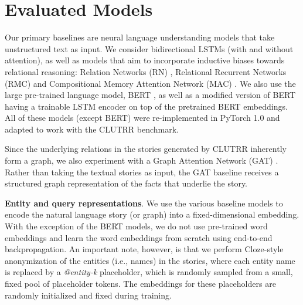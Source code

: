 \documentclass[letterpaper, 12pt]{report}
\newcommand{\xhdr}[1]{{\noindent\bfseries #1}.}
\begin{document}







\section{Evaluated Models}
\label{sec:clutrr_models}

Our primary baselines are neural language understanding models that take unstructured text as input.
We consider bidirectional LSTMs \citep{hochreiter1997long, cho2014learning} (with and without attention), as well as models that aim to incorporate inductive biases towards relational reasoning: Relation Networks (RN) \citep{santoro2017simple}, Relational Recurrent Networks (RMC) \citep{santoro2018relational} and Compositional Memory Attention Network (MAC) \citep{hudson2018compositional}. We also use the large pre-trained language model, BERT \citep{devlin-etal-2019-bert}, as well as a modified version of BERT having a trainable LSTM encoder on top of the pretrained BERT embeddings.
All of these models (except BERT) were re-implemented in PyTorch 1.0 \citep{paszke2017automatic} and adapted to work with the CLUTRR benchmark.

Since the underlying relations in the stories generated by CLUTRR inherently form a graph, we also experiment with a Graph Attention Network (GAT) \citep{Velickovic2017-mh}.
Rather than taking the textual stories as input, the GAT baseline receives a structured graph representation of the facts that underlie the story.


\xhdr{Entity and query representations}
We use the various baseline models to encode the natural language story (or graph) into a fixed-dimensional embedding.
With the exception of the BERT models, we do not use pre-trained word embeddings and learn the word embeddings from scratch using end-to-end backpropagation.
An important note, however, is that we perform Cloze-style anonymization \citep{hermann2015teaching} of the entities (i.e., names) in the stories, where each entity name is replaced by a \textit{@entity-k} placeholder, which is randomly sampled from a small, fixed pool of placeholder tokens. The embeddings for these placeholders are randomly initialized and fixed during training.
\end{document}
